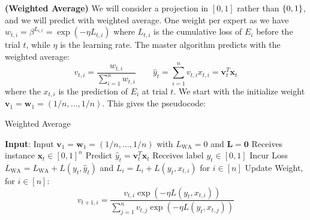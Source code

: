 \begin{definition}{\textbf{(Weighted Average)}}
    We will consider a projection in $[0, 1]$  rather than $\left\{ 0, 1 \right\}$, and we will predict with weighted average. One weight per expert as we have $w_{t, i} = \beta^{L_{i, t}} = \exp(-\eta L_{t, i})$ where $L_{t, i}$ is the cumulative loss of $E_i$ before the trial $t$, while $\eta$ is the learning rate. The master algorithm predicts with the weighted average:
    \begin{equation*}
        v_{t, i} = \frac{w_{t, i}}{\sum^n_{i=1}w_{t,i}} \qquad \hat{y}_t = \sum^n_{i=1}v_{t, i} x_{t, i} = \boldsymbol v_t^T\boldsymbol x_t
    \end{equation*}
    where the $x_{t, i}$ is the prediction of $E_i$ at trial $t$. We start with the initialize weight $\boldsymbol v_1 = \boldsymbol w_1 = (1/n,\dots,1/n)$. This gives the pseudocode:
    \begin{algorithm}[H]
        \caption{Weighted Average}
        \begin{algorithmic}[1]
            \State \textbf{Input}: Input $\boldsymbol v_1 = \boldsymbol w_1 = (1/n,\dots,1/n)$ with $L_\text{WA}=0$ and $\boldsymbol L = \boldsymbol 0$
                \State Receives instance $\boldsymbol x_t \in [0, 1]^n$
                \State Predict $\hat{y}_t = \boldsymbol v_t^T\boldsymbol x_t$
                \State Receives label $y_t \in [0, 1]$
                \State Incur Loss $L_\text{WA} = L_\text{WA}+ L(y_t, \hat{y}_t)$ and $L_i = L_i + L(y_t, x_{t, i})$ for $i \in [n]$
                \State Update Weight, for $i \in [n]$:
                \begin{equation*}
                    v_{t+1, i} = \frac{v_{t,i}\exp(-\eta L(y_t, x_{t, i}))}{\sum^n_{j=1}v_{t, j}\exp(-\eta L(y_t, x_{t, j}))}
                \end{equation*}
            \EndFor
        \end{algorithmic} 
    \end{algorithm}
\end{definition}

